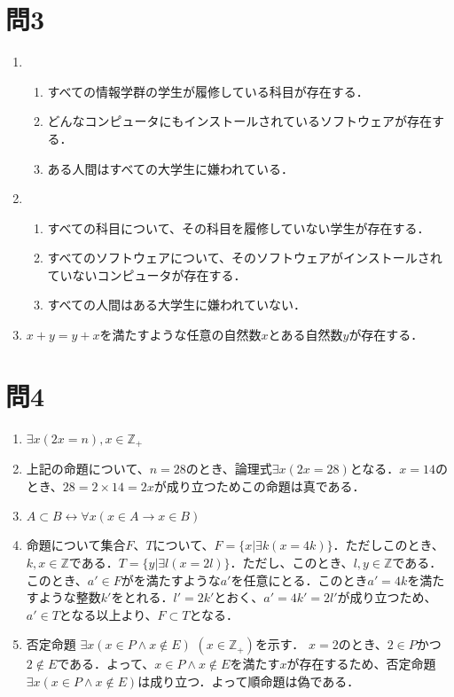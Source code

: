 \documentclass[uplatex]{jsarticle}
\begin{document}
\section{問3}
\begin{enumerate}
\vspace{12pt}

\item
	\begin{enumerate}
		\item すべての情報学群の学生が履修している科目が存在する．
		\item どんなコンピュータにもインストールされているソフトウェアが存在する．
		\item ある人間はすべての大学生に嫌われている．
	\end{enumerate}
\vspace{12pt}
\item
	\begin{enumerate}
		\item すべての科目について、その科目を履修していない学生が存在する．
		\item すべてのソフトウェアについて、そのソフトウェアがインストールされていないコンピュータが存在する．
		\item すべての人間はある大学生に嫌われていない．
	\end{enumerate}
\item $x + y = y + x$を満たすような任意の自然数$x$とある自然数$y$が存在する．
\end{enumerate}

\section{問4}
\begin{enumerate}
\vspace{12pt}

	\item $\exists x ( 2x = n ), x \in \mathbb{Z}_+$
	\item 上記の命題について、$n = 28$のとき、論理式$\exists x ( 2x = 28 )$となる．$x = 14$のとき、$28 = 2 \times 14 = 2x $が成り立つためこの命題は真である．
	\item $A \subset B \leftrightarrow \forall x (x \in A \rightarrow x \in B)$
	\item 命題について集合$F$、$T$について、$F = \{x | \exists k(x = 4k)\}$．ただしこのとき、$k, x \in \mathbb{Z}$である．$T = \{ y | \exists l (x=2l)\}$．ただし、このとき、$l,y \in \mathbb{Z}$である．このとき、$a' \in F$がを満たすような$a'$を任意にとる．このとき$a'=4k$を満たすような整数$k'$をとれる．$l' =2k'$とおく、$a' = 4k' =2l'$が成り立つため、$a' \in T$となる以上より、$F \subset T$となる．
	\item 
			否定命題 $\exists x (x \in P \land x \not\in E )$    $(x \in \mathbb{Z}_+)$を示す．
			$x = 2$のとき、$2 \in P$かつ$2 \not\in E$である．よって、$x \in P \land x \not\in E$を満たす$x$が存在するため、否定命題$\exists x ( x \in P \land x \not\in E )$は成り立つ．よって順命題は偽である．

\end{enumerate}
\end{document}
